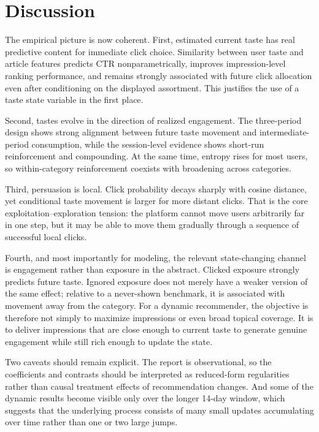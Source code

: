 \documentclass[11pt]{article}
\begin{document}
\section{Discussion}
\label{sec:discussion}

The empirical picture is now coherent. First, estimated current taste has real predictive content for immediate click choice. Similarity between user taste and article features predicts CTR nonparametrically, improves impression-level ranking performance, and remains strongly associated with future click allocation even after conditioning on the displayed assortment. This justifies the use of a taste state variable in the first place.

Second, tastes evolve in the direction of realized engagement. The three-period design shows strong alignment between future taste movement and intermediate-period consumption, while the session-level evidence shows short-run reinforcement and compounding. At the same time, entropy rises for most users, so within-category reinforcement coexists with broadening across categories.

Third, persuasion is local. Click probability decays sharply with cosine distance, yet conditional taste movement is larger for more distant clicks. That is the core exploitation--exploration tension: the platform cannot move users arbitrarily far in one step, but it may be able to move them gradually through a sequence of successful local clicks.

Fourth, and most importantly for modeling, the relevant state-changing channel is engagement rather than exposure in the abstract. Clicked exposure strongly predicts future taste. Ignored exposure does not merely have a weaker version of the same effect; relative to a never-shown benchmark, it is associated with movement away from the category. For a dynamic recommender, the objective is therefore not simply to maximize impressions or even broad topical coverage. It is to deliver impressions that are close enough to current taste to generate genuine engagement while still rich enough to update the state.

Two caveats should remain explicit. The report is observational, so the coefficients and contrasts should be interpreted as reduced-form regularities rather than causal treatment effects of recommendation changes. And some of the dynamic results become visible only over the longer 14-day window, which suggests that the underlying process consists of many small updates accumulating over time rather than one or two large jumps.
\end{document}
